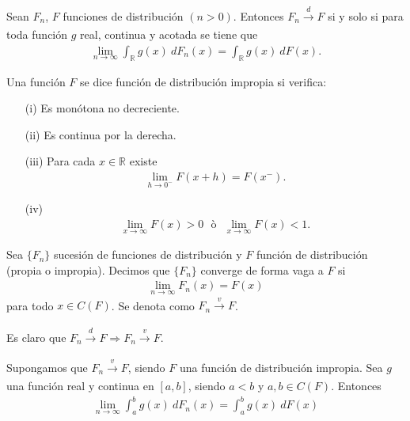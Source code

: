 \begin{teo}
    Sean $F_n$, $F$ funciones de distribución $(n > 0)$. Entonces $F_n \xrightarrow[]{d} F$ si y solo si para toda función $g$ real, continua y acotada se tiene que
    \begin{align*}
        \lim_{n \to \infty} \int_{\mathbb{R}} g(x) \ dF_n(x) = \int_{\mathbb{R}} g(x) \ dF(x).
    \end{align*}
\end{teo}

\begin{defi}
    Una función $F$ se dice función de distribución impropia si verifica:
    \begin{enumerate}
        \item[(i)] Es monótona no decreciente.
        \item[(ii)] Es continua por la derecha.
        \item[(iii)] Para cada $x \in \mathbb{R}$ existe
        \begin{align*}
            \lim_{h \to 0^-} F(x+h) = F(x^-).
        \end{align*}
        \item[(iv)]
        \begin{align*}
            \lim_{x \to \infty} F(x) > 0 \ \ \ \text{ò} \ \ \ \lim_{x \to \infty} F(x) < 1.
        \end{align*}
    \end{enumerate}
\end{defi}

\begin{defi}
    Sea $\{F_n\}$ sucesión de funciones de distribución y $F$ función de distribución (propia o impropia). Decimos que $\{F_n\}$ converge de forma vaga a $F$ si
    \begin{align*}
        \lim_{n \to \infty} F_n(x) = F(x)
    \end{align*}
    para todo $x \in C(F)$. Se denota como $F_n \xrightarrow[]{v} F$.
\end{defi}

\begin{obs}
    Es claro que $F_n \xrightarrow[]{d} F \Longrightarrow F_n \xrightarrow[]{v} F$.
\end{obs}

\begin{teo}
    Supongamos que $F_n \xrightarrow[]{v} F$, siendo $F$ una función de distribución impropia. Sea $g$ una función real y continua en $[a,b]$, siendo $a<b$ y $a,b \in C(F)$. Entonces
    \begin{align*}
        \lim_{n \to \infty} \int_{a}^{b} g(x) \ dF_n(x) = \int_{a}^{b} g(x) \ dF(x)
    \end{align*}
\end{teo}

